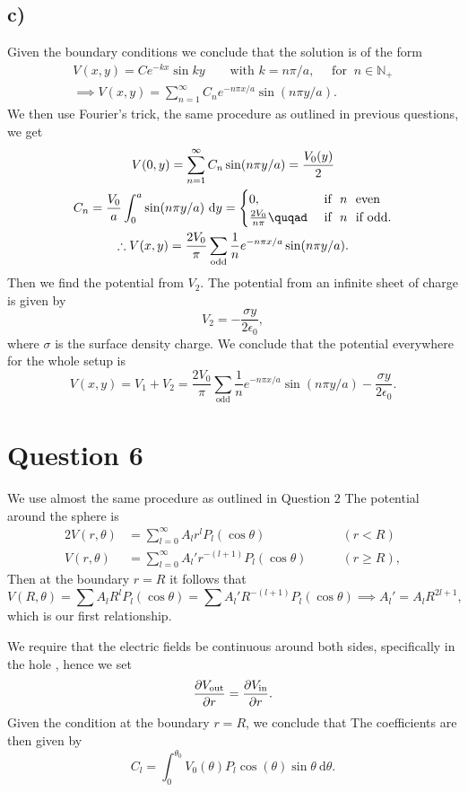 \documentclass[12pt]{article}
\newcommand{\ep}{\epsilon}
\theoremstyle{definition}
\theoremstyle{definition}
\theoremstyle{definition}
\theoremstyle{definition}
\theoremstyle{definition}
\theoremstyle{example}
\theoremstyle{note}
\theoremstyle{remark}
\theoremstyle{example}
\begin{document}
 			\subsection*{c) }
 			Given the boundary conditions we conclude that the solution is of the form
 			\begin{gather*}
 				V(x,y) = Ce^{-kx} \sin ky \qquad \text{with } k = n \pi / a ,\quad \text{ for } \ n \in \mathbb{N}_{+} \\
 				\implies V(x,y) = \sum_{n=1}^{\infty} C_{n} e^{-n \pi x / a }\sin (n \pi y /a).  
 			\end{gather*}
 			We then use Fourier's trick, the same procedure as outlined in previous questions, we get 
 			\begin{gather*}
 				V(0,y) = \sum_{n=1}^{\infty} C_{n} \sin (n \pi y/a) =\frac{V_{0}(y)}{2} \\
 				C_{n} = \frac{V_{0}}{a} \int_{0}^{a} \sin(n \pi y/a) \ \mathrm{d} y = \begin{cases}
 					 0, \quad &\text{ if } \ n \ \text{ even} \\
 					 \frac{2 V_{0}}{n \pi} \quqad &\text{ if } \ n \ \text{ if  odd}. 
 				\end{cases} \\
 				\therefore V(x,y) = \frac{2V_{0}}{\pi} \sum_{\text{odd}} \frac{1}{n} e^{-n \pi x /a} \sin (n \pi y /a).
 			\end{gather*}
 			Then we find the potential from $V_{2}$. The potential from an infinite sheet of charge is given by 
 			$$ V_{2} = -\frac{\sigma y}{2 \ep_{0}},$$
 			where $\sigma$ is the surface density charge. We conclude that the potential everywhere for the whole setup is 
 			$$ V(x,y) = V_{1} + V_{2} = \frac{2V_{0}}{\pi} \sum_{\text{odd}} \frac{1}{n} e^{-n \pi x /a} \sin (n \pi y /a) - \frac{\sigma y}{2 \ep_{0}}.$$
 		\section*{Question 6}
 			We use almost the same procedure as outlined in Question $2$ 
 			The potential around the sphere is 
 			\begin{alignat*}{2}
 			V(r,\theta) &= \sum_{l=0}^{\infty} A_{l} r^{l} P_{l} (\cos \theta) &\qquad (r < R)\\
 			V(r,\theta) &= \sum_{l=0}^{\infty} A_{l}' r^{-(l+1)} P_{l} (\cos \theta) &\qquad (r \ge R),
 			\end{alignat*}
 			Then at the boundary $r = R$ it follows that 
 			$$V(R,\theta) = \sum A_{l} R^{l} P_{l}(\cos \theta) = \sum A_{l}'R^{-(l+1)}P_{l}(\cos \theta) \implies A_{l}' = A_{l}R^{2l +1},$$
 			which is our first relationship. 
 			
 			\noindent We require that the electric fields be continuous around both sides, specifically in the hole , hence we set 
 			$$ \pdv{V_{\text{out}}}{r}= \pdv{V_{\text{in}}}{r}.$$
 			Given the condition at the boundary $r = R$, we conclude that 
 			The coefficients are then given by 
 			$$ C_{l} = \int_{0}^{\theta_{0}}V_{0}(\theta) P_{l}\cos(\theta) \sin \theta \ \mathrm{d} \theta. $$
	
\end{document}
